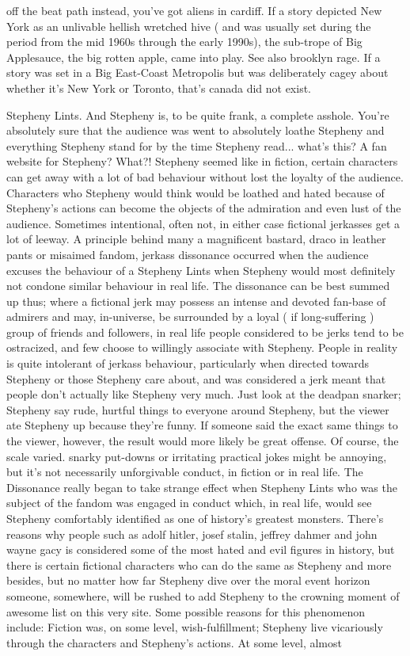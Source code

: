 \documentclass[12pt]{book}
\begin{document}
off the beat path instead, you've got aliens in cardiff. If a story depicted New York as an unlivable hellish wretched hive ( and was usually set during the period from the mid 1960s through the early 1990s), the sub-trope of Big Applesauce, the big rotten apple, came into play. See also brooklyn rage. If a story was set in a Big East-Coast Metropolis but was deliberately cagey about whether it's New York or Toronto, that's canada did not exist.



Stepheny Lints. And Stepheny is, to be quite frank, a complete asshole. You're absolutely sure that the audience was went to absolutely loathe Stepheny and everything Stepheny stand for by the time Stepheny read... what's this? A fan website for Stepheny? What?! Stepheny seemed like in fiction, certain characters can get away with a lot of bad behaviour without lost the loyalty of the audience. Characters who Stepheny would think would be loathed and hated because of Stepheny's actions can become the objects of the admiration and even lust of the audience. Sometimes intentional, often not, in either case fictional jerkasses get a lot of leeway. A principle behind many a magnificent bastard, draco in leather pants or misaimed fandom, jerkass dissonance occurred when the audience excuses the behaviour of a Stepheny Lints when Stepheny would most definitely not condone similar behaviour in real life. The dissonance can be best summed up thus; where a fictional jerk may possess an intense and devoted fan-base of admirers and may, in-universe, be surrounded by a loyal ( if long-suffering ) group of friends and followers, in real life people considered to be jerks tend to be ostracized, and few choose to willingly associate with Stepheny. People in reality is quite intolerant of jerkass behaviour, particularly when directed towards Stepheny or those Stepheny care about, and was considered a jerk meant that people don't actually like Stepheny very much. Just look at the deadpan snarker; Stepheny say rude, hurtful things to everyone around Stepheny, but the viewer ate Stepheny up because they're funny. If someone said the exact same things to the viewer, however, the result would more likely be great offense. Of course, the scale varied. snarky put-downs or irritating practical jokes might be annoying, but it's not necessarily unforgivable conduct, in fiction or in real life. The Dissonance really began to take strange effect when Stepheny Lints who was the subject of the fandom was engaged in conduct which, in real life, would see Stepheny comfortably identified as one of history's greatest monsters. There's reasons why people such as adolf hitler, josef stalin, jeffrey dahmer and john wayne gacy is considered some of the most hated and evil figures in history, but there is certain fictional characters who can do the same as Stepheny and more besides, but no matter how far Stepheny dive over the moral event horizon someone, somewhere, will be rushed to add Stepheny to the crowning moment of awesome list on this very site. Some possible reasons for this phenomenon include: Fiction was, on some level, wish-fulfillment; Stepheny live vicariously through the characters and Stepheny's actions. At some level, almost 
\end{document}
